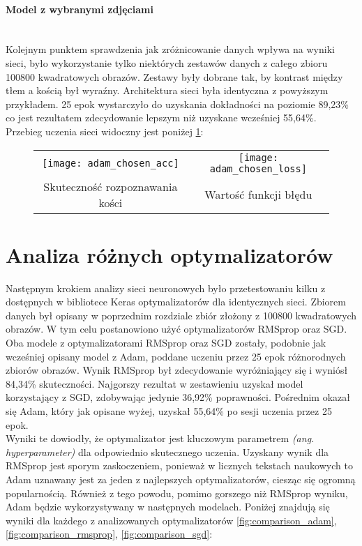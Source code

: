 \paragraph{Model z wybranymi zdjęciami} \mbox{}\\
Kolejnym punktem sprawdzenia jak zróżnicowanie danych wpływa na wyniki sieci, było
wykorzystanie tylko niektórych zestawów danych z całego zbioru 100800 kwadratowych obrazów.
Zestawy były dobrane tak, by kontrast między tłem a kością był wyraźny. Architektura sieci
była identyczna z powyższym przykładem. 25 epok wystarczyło do uzyskania dokładności
na poziomie 89,23\% co jest rezultatem zdecydowanie lepszym niż uzyskane wcześniej 55,64\%.\\
Przebieg uczenia sieci widoczny jest poniżej \ref{fig:chosen_plots}: \newpage

\begin{figure}[h!]
\begin{center}
\begin{tabular}{cc}
\texttt{[image: adam\_chosen\_acc]} &
\texttt{[image: adam\_chosen\_loss]} \\
 Skuteczność rozpoznawania kości & Wartość funkcji błędu\\
\end{tabular}
\label{fig:chosen_plots}
\end{center}
\end{figure}

\section{Analiza różnych optymalizatorów}
Następnym krokiem analizy sieci neuronowych było przetestowaniu kilku z dostępnych
w bibliotece Keras optymalizatorów dla identycznych sieci. Zbiorem danych był
opisany w poprzednim rozdziale zbiór złożony z 100800 kwadratowych obrazów.
W tym celu postanowiono użyć optymalizatorów RMSprop oraz SGD.\\
Oba modele z optymalizatorami RMSprop oraz SGD zostały, podobnie jak wcześniej opisany model
z Adam, poddane uczeniu przez 25 epok różnorodnych zbiorów obrazów. Wynik RMSprop
był zdecydowanie wyróżniający się i wyniósł 84,34\% skuteczności. Najgorszy rezultat w zestawieniu
uzyskał model korzystający z SGD, zdobywając jedynie 36,92\% poprawności. Pośrednim okazał
się Adam, który jak opisane wyżej, uzyskał 55,64\% po sesji uczenia przez 25 epok.\\
Wyniki te dowiodły, że optymalizator jest kluczowym parametrem \textit{(ang. hyperparameter)}
dla odpowiednio skutecznego uczenia. Uzyskany wynik dla RMSprop jest sporym zaskoczeniem,
ponieważ w licznych tekstach naukowych to Adam uznawany jest za jeden z najlepszych
optymalizatorów, ciesząc się ogromną popularnością. Również z tego powodu, pomimo
gorszego niż RMSprop wyniku, Adam będzie wykorzystywany w następnych modelach.
Poniżej znajdują się wyniki dla każdego z analizowanych optymalizatorów
\ref{fig:comparison_adam}, \ref{fig:comparison_rmsprop}, \ref{fig:comparison_sgd}:

